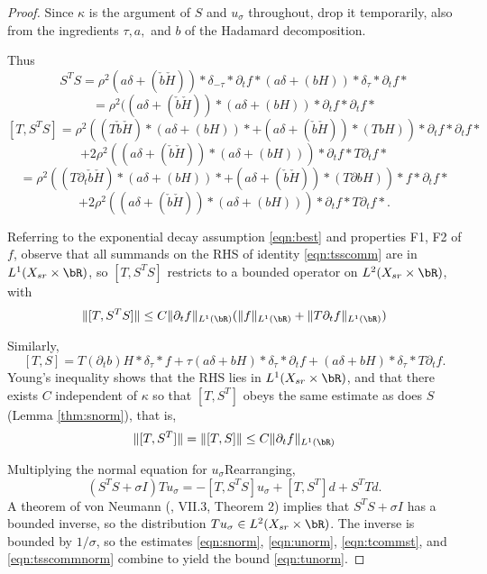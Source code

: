 \begin{proof}
  Since $\kappa$ is the argument of $S$ and $u_{\sigma}$ throughout, drop it
  temporarily, also from the ingredients $\tau, a, $ and $b$ of the
  Hadamard decomposition.
  
  Thus
  \[
    S^TS =
    \rho^2(a\delta  +  (\check{b}\check{H})) *\delta_{-\tau}*\partial_t
    f * (a\delta  +  (bH)) *\delta_{\tau}*\partial_t f*
  \]
  \[
    = \rho^2((a\delta  +  (\check{b}\check{H}))*(a\delta  +
    (bH))*\partial_t f *\partial_t f*
  \]
  \[
    [T,S^TS] = \rho^2((T\check{b}\check{H}) *(a\delta  +
    (bH))*+ (a\delta  +  (\check{b}\check{H}))*(TbH))*\partial_t f
    *\partial_t f*
  \]
  \[
    +2\rho^2((a\delta  +  (\check{b}\check{H}))*(a\delta  +
    (bH)))* \partial_t f  *T\partial_t f*
  \]
  \[
    =\rho^2((T\partial_t\check{b}\check{H}) *(a\delta  +
    (bH))*+ (a\delta  +  (\check{b}\check{H}))*(T\partial bH))* f
    *\partial_t f*
   \]
  \begin{equation}
    \label{eqn:tsscomm}
     +2\rho^2((a\delta  +  (\check{b}\check{H}))*(a\delta  +
    (bH)))* \partial_t f  *T\partial_t f*.
  \end{equation}
  
  Referring to the exponential decay assumption \ref{eqn:best}
  and properties F1, F2 of $f$, 
  observe that all summands on the RHS of identity \ref{eqn:tsscomm} are in
  $L^1(X_{sr} \times \bR)$, so $[T,S^TS]$ restricts to a bounded
  operator on $L^2(X_{sr}\times \bR)$, with
  \begin{equation}
    \label{eqn:tsscommnorm}
    \|[T,S^TS]\| \le C\|\partial_t f\|_{L^1(\bR)}(\|f\|_{L^1(\bR)}+\|T\partial_tf\|_{L^1(\bR)})
  \end{equation}
  
  Similarly,
  \[
    [T,S]=T(\partial_t b)H*\delta_{\tau}*f + \tau(a\delta +
    bH)*\delta_{\tau}*\partial_t f + (a\delta +
    bH)*\delta_{\tau}*T\partial_t f.
  \]
  Young's inequality shows that the RHS lies in $L^1(X_{sr}\times
  \bR)$, and that there exists $C$ independent of $\kappa$ so that
  $[T,S^T]$ obeys the same estimate as does $S$ (Lemma
  \ref{thm:snorm}), that is,
  \begin{equation}
    \label{eqn:tcommst}  
    \|[T,S^T]\| = \|[T,S]\| \le C\|\partial_t f\|_{L^1(\bR)}
  \end{equation}
  
  Multiplying the normal equation for $u_{\sigma}$Rearranging,
  \[
    (S^TS+\sigma I)Tu_{\sigma} = -[T,S^TS]u_{\sigma} + [T,S^T]d + S^TTd.
  \]
  A theorem of von Neumann (\cite{Yosida}, VII.3, Theorem 2) implies
  that $S^TS+\sigma I$ has a bounded inverse, so the distribution
  $Tu_{\sigma} \in L^2(X_{sr} \times \bR)$. The inverse is bounded by
  $1/\sigma$, so the estimates \ref{eqn:snorm}, \ref{eqn:unorm},
  \ref{eqn:tcommst}, and \ref{eqn:tsscommnorm} combine to yield the
  bound \ref{eqn:tunorm}.
  
\end{proof}

